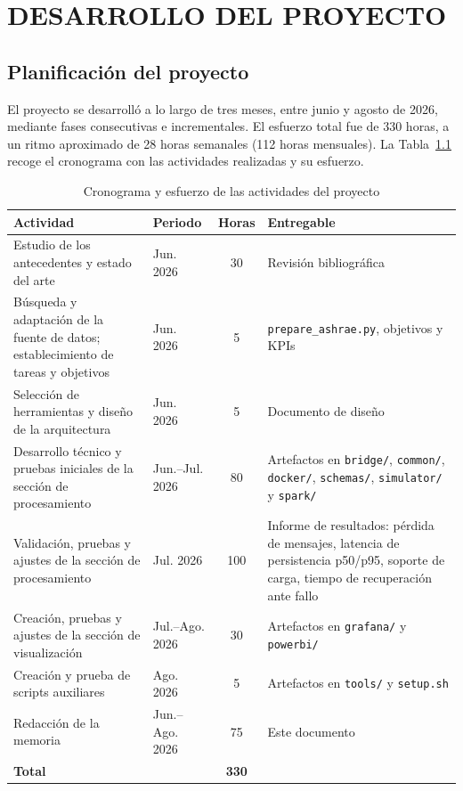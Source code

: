 \chapter{DESARROLLO DEL PROYECTO}
\section{Planificación del proyecto}

El proyecto se desarrolló a lo largo de tres meses, entre junio y agosto de 2026, mediante fases consecutivas e incrementales. El esfuerzo total fue de 330 horas, a un ritmo aproximado de 28 horas semanales (112 horas mensuales). La Tabla~\ref{tab:planificacion} recoge el cronograma con las actividades realizadas y su esfuerzo.

\begin{table}[ht!]
  \centering
  \small
  \begin{tabular}{|p{4.3cm}|p{1.7cm}|c|p{5.8cm}|}
    \hline
    \textbf{Actividad} & \textbf{Periodo} & \textbf{Horas} & \textbf{Entregable} \\ \hline
    Estudio de los antecedentes y estado del arte & Jun. 2026 & 30 & Revisión bibliográfica \\ \hline
    Búsqueda y adaptación de la fuente de datos; establecimiento de tareas y objetivos & Jun. 2026 & 5 & \texttt{prepare\_ashrae.py}, objetivos y KPIs \\ \hline
    Selección de herramientas y diseño de la arquitectura & Jun. 2026 & 5 & Documento de diseño \\ \hline
    Desarrollo técnico y pruebas iniciales de la sección de procesamiento & Jun.--Jul. 2026 & 80 & Artefactos en \texttt{bridge/}, \texttt{common/}, \texttt{docker/}, \texttt{schemas/}, \texttt{simulator/} y \texttt{spark/} \\ \hline
    Validación, pruebas y ajustes de la sección de procesamiento & Jul. 2026 & 100 & Informe de resultados: pérdida de mensajes, latencia de persistencia p50/p95, soporte de carga, tiempo de recuperación ante fallo \\ \hline
    Creación, pruebas y ajustes de la sección de visualización & Jul.--Ago. 2026 & 30 & Artefactos en \texttt{grafana/} y \texttt{powerbi/} \\ \hline
    Creación y prueba de scripts auxiliares & Ago. 2026 & 5 & Artefactos en \texttt{tools/} y \texttt{setup.sh} \\ \hline
    Redacción de la memoria & Jun.--Ago. 2026 & 75 & Este documento \\ \hline
    \textbf{Total} & & \textbf{330} & \\ \hline
  \end{tabular}
  \caption{Cronograma y esfuerzo de las actividades del proyecto}
  \label{tab:planificacion}
\end{table}

